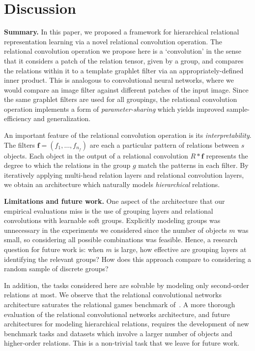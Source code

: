 
\section{Discussion}\label{sec:discussion}

\textbf{Summary.} In this paper, we proposed a framework for hierarchical relational representation learning via a novel relational convolution operation. The relational convolution operation we propose here is a `convolution' in the sense that it considers a patch of the relation tensor, given by a group, and compares the relations within it to a template graphlet filter via an appropriately-defined inner product. This is analogous to convolutional neural networks, where we would compare an image filter against different patches of the input image. Since the same graphlet filters are used for all groupings, the relational convolution operation implements a form of \textit{parameter-sharing} which yields improved sample-efficiency and generalization.

An important feature of the relational convolution operation is its \textit{interpretability}. The filters $\bm{f} = (f_1, \ldots, f_{n_f})$ are each a particular pattern of relations between $s$ objects. Each object in the output of a relational convolution $R \ast \bm{f}$ represents the degree to which the relations in the group $g$ match the patterns in each filter. By iteratively applying multi-head relation layers and relational convolution layers, we obtain an architecture which naturally models \textit{hierarchical} relations.

\textbf{Limitations and future work.} One aspect of the architecture that our empirical evaluations miss is the use of grouping layers and relational convolutions with learnable soft groups. Explicitly modeling groups was unnecessary in the experiments we considered since the number of objects $m$ was small, so considering all possible combinations was feasible. Hence, a research question for future work is: when $m$ is large, how effective are grouping layers at identifying the relevant groups? How does this approach compare to considering a random sample of discrete groups?

In addition, the tasks considered here are solvable by modeling only second-order relations at most. We observe that the relational convolutional networks architecture saturates the relational games benchmark of~\citep{shanahanExplicitlyRelationalNeural}. A more thorough evaluation of the relational convolutional networks architecture, and future architectures for modeling hierarchical relations, requires the development of new benchmark tasks and datasets which involve a larger number of objects and higher-order relations. This is a non-trivial task that we leave for future work.

